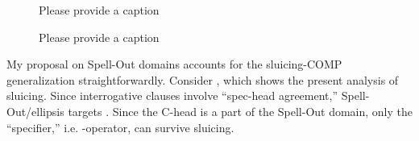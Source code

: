 \documentclass[output=paper]{langscibook}
\begin{document}
\begin{figure}
\begin{floatrow}
\captionsetup{margin=.05\linewidth}

{\caption{\color{red}Please provide a caption\label{aranostructure sluice}}}
        {\caption{\color{red}Please provide a caption\label{aranomy structure sluice}}}
\end{floatrow}
\end{figure}

My proposal on Spell-Out domains accounts for the sluicing-COMP generalization straightforwardly. Consider , which shows the present analysis of sluicing. Since interrogative clauses involve ``spec-head agreement,'' Spell-Out/ellipsis targets . Since the C-head is a part of the Spell-Out domain, only the ``specifier,'' i.e. \wh-operator, can survive sluicing. 
\end{document}

